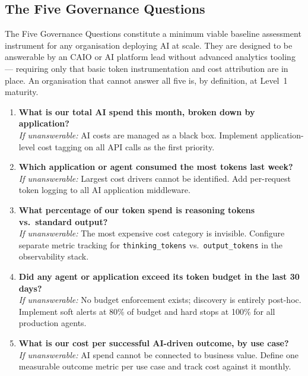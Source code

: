 \documentclass[11pt,twocolumn]{article}
\begin{document}
\subsection{The Five Governance Questions}
\label{sec:questions}

The Five Governance Questions constitute a minimum viable baseline assessment
instrument for any organisation deploying AI at scale. They are designed to be
answerable by an CAIO or AI platform lead without advanced analytics tooling
--- requiring only that basic token instrumentation and cost attribution are
in place. An organisation that cannot answer all five is, by definition, at
Level~1 maturity.

\begin{enumerate}[leftmargin=*, label=\textbf{Q\arabic*.}, itemsep=4pt]

\item \textbf{What is our total AI spend this month, broken down by application?}\\
\textit{If unanswerable:} AI costs are managed as a black box. Implement application-level
cost tagging on all API calls as the first priority.

\item \textbf{Which application or agent consumed the most tokens last week?}\\
\textit{If unanswerable:} Largest cost drivers cannot be identified. Add per-request
token logging to all AI application middleware.

\item \textbf{What percentage of our token spend is reasoning tokens vs.\ standard output?}\\
\textit{If unanswerable:} The most expensive cost category is invisible. Configure
separate metric tracking for \texttt{thinking\_tokens} vs.\ \texttt{output\_tokens}
in the observability stack.

\item \textbf{Did any agent or application exceed its token budget in the last 30 days?}\\
\textit{If unanswerable:} No budget enforcement exists; discovery is entirely post-hoc.
Implement soft alerts at 80\% of budget and hard stops at 100\% for all production agents.

\item \textbf{What is our cost per successful AI-driven outcome, by use case?}\\
\textit{If unanswerable:} AI spend cannot be connected to business value. Define one
measurable outcome metric per use case and track cost against it monthly.

\end{enumerate}
\end{document}
